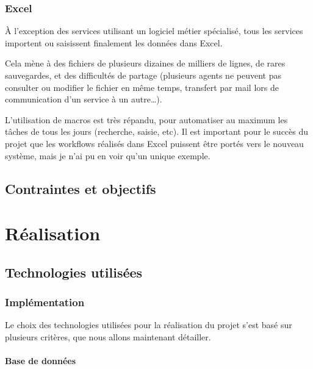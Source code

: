\documentclass[11pt,french]{memoir}
\begin{document}
	\subsection{Excel}\label{subsec:excel}

	À l'exception des services utilisant un logiciel métier spécialisé, tous les services importent ou saisissent finalement les données dans Excel.

	Cela mène à des fichiers de plusieurs dizaines de milliers de lignes, de rares sauvegardes, et des difficultés de partage (plusieurs agents ne peuvent pas consulter ou modifier le fichier en même temps, transfert par mail lors de communication d'un service à un autre…).

	L'utilisation de macros est très répandu, pour automatiser au maximum les tâches de tous les jours (recherche, saisie, etc).
	Il est important pour le succès du projet que les workflows réalisés dans Excel puissent être portés vers le nouveau système, mais je n'ai pu en voir qu'un unique exemple.


	\section{Contraintes et objectifs}\label{sec:contraintes-et-objectifs}


	\chapter{Réalisation}\label{ch:realisation}


	\section{Technologies utilisées}\label{sec:technologies-utilisees}

	\subsection{Implémentation}\label{subsec:livrables-et-developpement}

	Le choix des technologies utilisées pour la réalisation du projet s’est basé sur plusieurs critères, que nous allons maintenant détailler.

	\subsubsection{Base de données}
\end{document}
